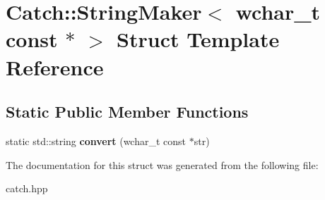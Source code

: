 \hypertarget{structCatch_1_1StringMaker_3_01wchar__t_01const_01_5_01_4}{}\section{Catch\+::String\+Maker$<$ wchar\+\_\+t const $\ast$ $>$ Struct Template Reference}
\label{structCatch_1_1StringMaker_3_01wchar__t_01const_01_5_01_4}
\subsection*{Static Public Member Functions}
\begin{DoxyCompactItemize}
\item 
\mbox{\label{structCatch_1_1StringMaker_3_01wchar__t_01const_01_5_01_4_ae7535a1f417ace45ca05e4389334ffeb}} 
static std\+::string {\bfseries convert} (wchar\+\_\+t const $\ast$str)
\end{DoxyCompactItemize}


The documentation for this struct was generated from the following file\+:\begin{DoxyCompactItemize}
\item 
catch.\+hpp\end{DoxyCompactItemize}

